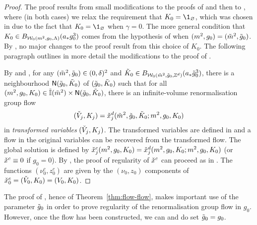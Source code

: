 \begin{proof}
The proof results from small modifications to the proofs of
\cite[Proposition~\ref{log-prop:flow-flow}]{BBS-saw4-log} and then to
\cite[Proposition~\ref{log-prop:KjNbd}]{BBS-saw4-log},
where (in both cases) we relax the requirement that $K_0 = \1_\varnothing$,
which was chosen in \cite{BBS-saw4-log} due to the fact that
$K_0 = \1_\varnothing$ when $\gamma=0$.
The more general condition that $K_0 \in B_{\mathcal{W}_0(m^2, g_0, \Lambda)}(a_* g_0^3)$
comes from the hypothesis of \cite[Theorem~\ref{flow-thm:flow}]{BBS-rg-flow}
when $(m^2, g_0) = (\tilde{m}^2, \tilde{g}_0)$.
By \cite[Remark~\ref{flow-rk:Nrad}]{BBS-rg-flow}, no major changes to the proof
result from this choice of $K_0$.
The following paragraph outlines
in more detail the modifications to the proof of
\cite[Proposition~\ref{log-prop:flow-flow}]{BBS-saw4-log}.

By \cite[Theorem~\ref{flow-thm:flow}]{BBS-rg-flow} and
\cite[Corollary~\ref{flow-cor:masscont}]{BBS-rg-flow},
for any $(\tilde{m}^2, \tilde{g}_0) \in (0, \delta)^2$ and
$\tilde K_0 \in B_{\mathcal{W}_0(\tilde{m}^2, \tilde{g}_0, { {{\mathbb Z}}^d })}(a_* \tilde{g}_0^3)$,
there is a neighbourhood
${\sf N}(\tilde{g}_0, \tilde K_0)$ of $(\tilde{g}_0, \tilde K_0)$
such that for all
$(m^2, g_0, K_0) \in \tilde{\mathbb{I}}(\tilde{m}^2) \times {\sf N}(\tilde{g}_0, \tilde K_0)$,
there is an infinite-volume renormalisation group flow
\begin{equation}
(\check{V}_j, K_j) = \check{x}^d_j(\tilde{m}^2, \tilde{g}_0, \tilde K_0; m^2, g_0, K_0)
\end{equation}
in \emph{transformed variables} $(\check{V}_j, K_j)$.
The transformed variables are defined in
\cite[Section~\ref{log-sec:trans}]{BBS-saw4-log} and a flow
in the original variables can be recovered from the transformed flow.
The global solution is defined by
$\check{x}^c_j(m^2, g_0, K_0) = \check{x}^d_j(m^2, g_0, K_0; m^2, g_0, K_0)$
(or $\check{x}^c \equiv 0$ if $g_0 = 0$).
By \cite[Remark~\ref{flow-rk:Nrad}]{BBS-rg-flow},
the proof of regularity of $\check{x}^c$ can proceed as in \cite{BBS-saw4-log}.
The functions $(\nu_0^c, z_0^c)$ are given by the $(\nu_0, z_0)$ components
of $\check{x}^c_0 = (\check{V}_0, K_0) = (V_0, K_0)$.
\end{proof}


\begin{rk}
The proof of \cite[Proposition~\ref{log-prop:flow-flow}]{BBS-saw4-log},
hence of Theorem~\ref{thm:flow-flow},
makes important use of the parameter $\tilde{g}_0$ in order to prove regularity
of the renormalisation group flow in $g_0$. However, once the flow has been
constructed, we can and do set $\tilde{g}_0 = g_0$.
\end{rk}

